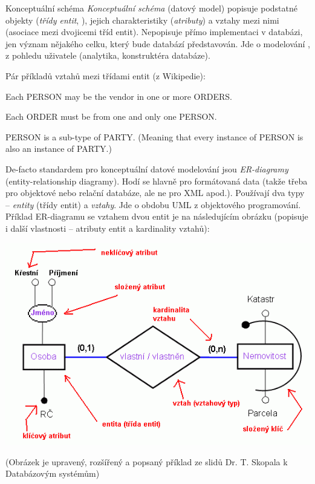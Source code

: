 \begin{obecne}{Konceptuální schéma}
\emph{Konceptuální schéma} (datový model) popisuje podstatné objekty (\emph{třídy entit}, ), jejich charakteristiky (\emph{atributy}) a vztahy mezi nimi (asociace mezi dvojicemi tříd entit). Nepopisuje přímo implementaci v databázi, jen význam nějakého celku, který bude databází představován. Jde o modelování , z pohledu uživatele (analytika, konstruktéra databáze).

\medskip
\begin{priklady}
Pár příkladů vztahů mezi třídami entit (z Wikipedie):
\begin{pitemize}
    \item Each PERSON may be the vendor in one or more ORDERS.
    \item Each ORDER must be from one and only one PERSON.
    \item PERSON is a sub-type of PARTY. (Meaning that every instance of PERSON is also an instance of PARTY.)
\end{pitemize}
\end{priklady}
De-facto standardem pro konceptuální datové modelování jsou \emph{ER-diagramy} (entity-relationship diagramy). Hodí se hlavně pro  formátovaná data (takže třeba pro objektové nebo relační databáze, ale ne pro XML apod.). Používají dva typy  -- \emph{entity} (třídy entit) a \emph{vztahy}. Jde o obdobu UML z objektového programování. Příklad ER-diagramu se vztahem dvou entit je na následujícím obrázku (popisuje i další vlastnosti -- atributy entit a kardinality vztahů):
\begin{center}
\includegraphics[width=14cm]{informatika/databazy/obrazky/er-schema.png}

(Obrázek je upravený, rozšířený a popsaný příklad ze slidů Dr. T. Skopala k Databázovým systémům)
\end{center}
\end{obecne}

